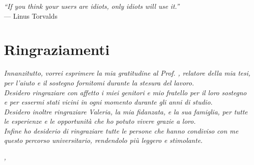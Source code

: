 \cleardoublepage
{}
{}

\begin{flushright}{
        \slshape
        ``If you think your users are idiots, only idiots will use it.''} \\
    \medskip
    --- Linus Torvalds
\end{flushright}


\bigskip

\begingroup
\let\clearpage\relax
\let\cleardoublepage\relax
\let\cleardoublepage\relax

\chapter*{Ringraziamenti}

\noindent \textit{Innanzitutto, vorrei esprimere la mia gratitudine al Prof. \myProf, relatore della mia tesi, per l'aiuto e il sostegno fornitomi durante la stesura del lavoro.}\\

\noindent \textit{Desidero ringraziare con affetto i miei genitori e mio fratello per il loro
    sostegno e per essermi stati vicini in ogni momento durante gli anni di
    studio.}\\

\noindent \textit{Desidero inoltre ringraziare Valeria, la mia fidanzata, e la
    sua famiglia, per tutte le esperienze e le opportunità che ho potuto vivere
    grazie a loro.}\\

\noindent \textit{Infine ho desiderio di ringraziare tutte le persone che hanno
    condiviso con me questo percorso universitario, rendendolo più leggero e stimolante.}\\
\bigskip

\noindent\textit{\myLocation, \myTime}
\hfill \myName

\endgroup
